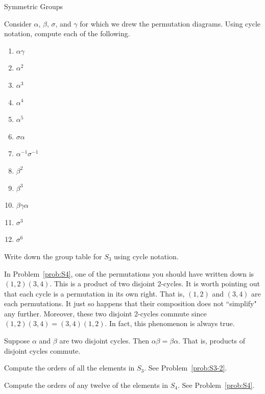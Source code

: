 \begin{section}{Symmetric Groups}
\begin{problem}
Consider $\alpha$, $\beta$, $\sigma$, and $\gamma$ for which we drew the permutation diagrams.  Using cycle notation, compute each of the following.
\begin{multicols}{2}
\begin{enumerate}[label=\rm{(\alph*)}]
\item $\alpha\gamma$
\item $\alpha^2$
\item $\alpha^3$
\item $\alpha^4$
\item $\alpha^5$
\item $\sigma\alpha$
\item $\alpha^{-1}\sigma^{-1}$
\item $\beta^2$
\item $\beta^3$
\item $\beta\gamma\alpha$
\item $\sigma^3$
\item $\sigma^6$
\end{enumerate}
\end{multicols}
\end{problem}

\begin{problem}
Write down the group table for $S_3$ using cycle notation.
\end{problem}

In Problem~\ref{prob:S4}, one of the permutations you should have written down is $(1,2)(3,4)$.  This is a product of two disjoint 2-cycles.  It is worth pointing out that each cycle is a permutation in its own right.  That is, $(1,2)$ and $(3,4)$ are each permutations.  It just so happens that their composition does not ``simplify" any further.  Moreover, these two disjoint 2-cycles commute since $(1,2)(3,4)=(3,4)(1,2)$.  In fact, this phenomenon is always true.

\begin{theorem}
Suppose $\alpha$ and $\beta$ are two disjoint cycles.  Then $\alpha\beta=\beta\alpha$.  That is, products of disjoint cycles commute.
\end{theorem}

\begin{problem}
Compute the orders of all the elements in $S_3$.  See Problem~\ref{prob:S3-2}.
\end{problem}

\begin{problem}
Compute the orders of any twelve of the elements in $S_4$.  See Problem~\ref{prob:S4}.
\end{problem}


\end{section}
